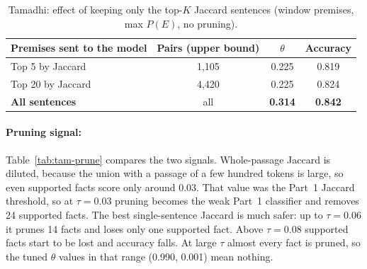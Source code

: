\documentclass[12pt,a4paper]{article}
\begin{document}
\begin{table}[H]
\centering
\small
\begin{tabular}{lccc}
\toprule
Premises sent to the model & Pairs (upper bound) & $\theta$ & Accuracy \\
\midrule
Top 5 by Jaccard  & 1{,}105 & 0.225 & 0.819 \\
Top 20 by Jaccard & 4{,}420 & 0.225 & 0.824 \\
\textbf{All sentences} & all & \textbf{0.314} & \textbf{0.842} \\
\bottomrule
\end{tabular}
\caption{Tamadhi: effect of keeping only the top-$K$ Jaccard sentences (window premises, max $P(E)$, no pruning).}
\label{tab:tam-k}
\end{table}

\paragraph{Pruning signal:} Table~\ref{tab:tam-prune} compares the two signals. Whole-passage Jaccard is diluted, because the union with a passage of a few hundred tokens is large, so even supported facts score only around $0.03$. That value was the Part~1 Jaccard threshold, so at $\tau = 0.03$ pruning becomes the weak Part~1 classifier and removes 24 supported facts. The best single-sentence Jaccard is much safer: up to $\tau = 0.06$ it prunes 14 facts and loses only one supported fact. Above $\tau = 0.08$ supported facts start to be lost and accuracy falls. At large $\tau$ almost every fact is pruned, so the tuned $\theta$ values in that range (0.990, 0.001) mean nothing.
\end{document}
